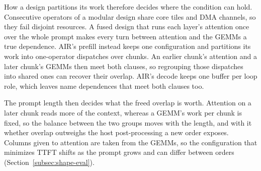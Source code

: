 How a design partitions its work therefore decides where the condition can hold.
Consecutive operators of a modular design share core tiles and DMA channels, so they fail disjoint resources.
A fused design that runs each layer's attention once over the whole prompt makes every turn between attention and the GEMMs a true dependence.
AIR's prefill instead keeps one configuration and partitions its work into one-operator dispatches over chunks.
An earlier chunk's attention and a later chunk's GEMMs then meet both clauses, so regrouping those dispatches into shared ones can recover their overlap.
AIR's decode keeps one buffer per loop role, which leaves name dependences that meet both clauses too.

The prompt length then decides what the freed overlap is worth.
Attention on a later chunk reads more of the context, whereas a GEMM's work per chunk is fixed, so the balance between the two groups moves with the length, and with it whether overlap outweighs the host post-processing a new order exposes.
Columns given to attention are taken from the GEMMs, so the configuration that minimizes TTFT shifts as the prompt grows and can differ between orders (Section~\ref{subsec:shape-eval}).
